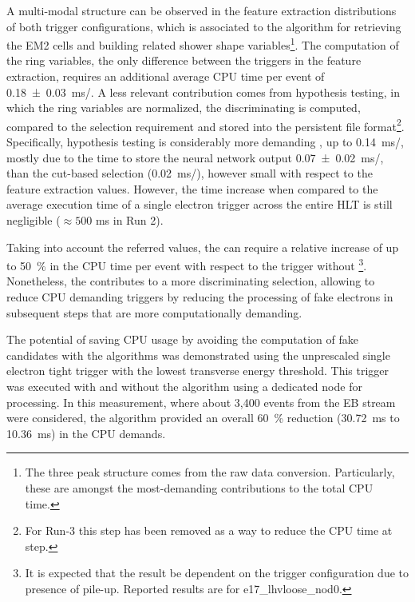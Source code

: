 A multi-modal structure can be observed in the feature extraction distributions
of both trigger configurations, which is associated to the algorithm
for retrieving the EM2 cells and building related shower shape
variables\footnote{The three peak structure comes from the raw data conversion.
	Particularly, these are amongst the most-demanding contributions to
	the \fastcalo total CPU time.}. The computation of the ring variables, the only difference between the
triggers in the \fastcalo feature extraction, requires an additional average CPU time per
event of \SI{0.18 \pm 0.03}{\ms/}. 
A less relevant contribution
comes from hypothesis testing, in which the ring variables are normalized, the
discriminating is computed, compared to the selection requirement and stored into the persistent file format\footnote{For Run-3 this step has been removed as a way to reduce the CPU time at \fastcalo step.}. 
Specifically, \rnn{} hypothesis testing is considerably more demanding
, up to \SI{0.14}{\ms/}, mostly due to the time 
to store the neural network output \SI{0.07 \pm 0.02}{\ms/}, 
than the cut-based selection
(\SI{0.02}{\ms/}), however small with respect to the feature
extraction values. However, the time increase when compared to the average execution time of a single electron trigger across the entire HLT is still negligible ($\approx 500$ ms in Run 2).

Taking into account the referred values, the \rnn{} can require a
relative increase of up to \SI{50}{\%} in the \fastcalo{} CPU time per event
with respect to the trigger without \rnn{}\footnote{It is expected that the result be
	dependent on the trigger configuration due to presence of pile-up. Reported
	results are for e17\_lhvloose\_nod0.}. Nonetheless, the \rnn{} contributes to
a more discriminating selection, allowing to reduce CPU demanding triggers
by reducing the processing of fake electrons in subsequent steps that are more computationally demanding.






The potential of saving CPU usage by
avoiding the computation of fake candidates with the \rnn algorithms was demonstrated using the unprescaled single electron tight trigger with the lowest transverse energy threshold. This trigger was executed with
and without the \rnn{} algorithm using a dedicated node for processing.
In this measurement, where about 3,400 events from the EB stream were considered, the \rnn{} algorithm provided an overall
\SI{60}{\%} reduction (\SI{30.72}{\milli\second} to \SI{10.36}{\milli\second})
in the CPU demands.


